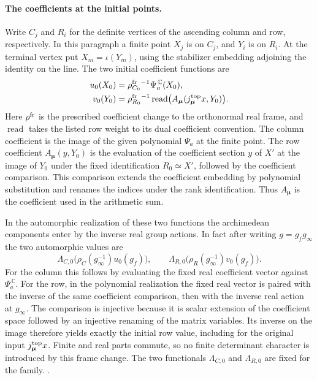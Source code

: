 \paragraph{The coefficients at the initial points.}
Write \(C_j\) and \(R_i\) for the definite vertices of the
ascending column and row, respectively. In this paragraph a
finite point \(X_j\) is on \(C_j\), and \(Y_i\) is on \(R_i\).
At the terminal vertex put \(X_m=\iota(Y_m)\), using the
stabilizer embedding adjoining the identity on the line.
The two initial coefficient functions are
\[
 \begin{split}
 u_0(X_0)&=\rho^{\rm fr}_{C_0}{}^{-1}
                      \Psi_a^{\,\mathbb C}(X_0),\\
 v_0(Y_0)&=\rho^{\rm fr}_{R_0}{}^{-1}
                    \operatorname{read}\bigl(A_{\boldsymbol\mu}
                           (j_{\boldsymbol\mu}^{\rm top}x,Y_0)\bigr).
 \end{split}
\]
Here \(\rho^{\rm fr}\) is the prescribed coefficient change to
the orthonormal real frame, and \(\operatorname{read}\) takes the
listed row weight to its dual coefficient convention.
The column coefficient is the image of the given polynomial
\(\Psi_a\) at the finite point. The row coefficient
\(A_{\boldsymbol\mu}(y,Y_0)\) is the evaluation of the
coefficient section \(y\) of \(X'\) at the image of \(Y_0\)
under the fixed identification \(R_0\simeq X'\), followed by the
coefficient comparison. This comparison extends the coefficient
embedding by polynomial substitution and renames the indices
under the rank identification. Thus \(A_{\boldsymbol\mu}\) is
the coefficient used in the arithmetic sum.

In the automorphic realization of these two functions the
archimedean components enter by the inverse real group actions.
In fact after writing \(g=g_fg_\infty\) the two automorphic values
are
\[
 \Lambda_{C,0}\bigl(\rho_C(g_\infty^{-1})u_0(g_f)\bigr),
 \qquad
 \Lambda_{R,0}\bigl(\rho_R(g_\infty^{-1})v_0(g_f)\bigr).
\]
For the column this follows by evaluating the fixed real
coefficient vector against \(\Psi_a^{\,\mathbb C}\). For the
row, in the polynomial realization the fixed real vector is
paired with the inverse of the same coefficient comparison,
then with the inverse real action at \(g_\infty\). The
comparison is injective because it is scalar extension of the
coefficient space followed by an injective renaming of the
matrix variables. Its inverse on the image therefore yields
exactly the initial row value, including for the original
input \(j_{\boldsymbol\mu}^{\rm top}x\). Finite and real parts
commute, so no finite determinant character is introduced by
this frame change. The two functionals \(\Lambda_{C,0}\) and
\(\Lambda_{R,0}\) are fixed for the family.
.

